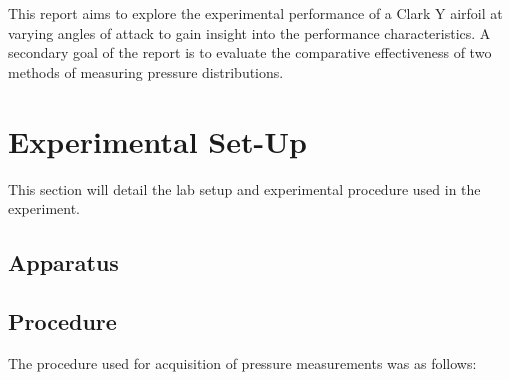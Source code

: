 \documentclass[runningheads]{llncs}
\begin{document}
This report aims to explore the experimental performance of a Clark Y airfoil at varying angles of attack to gain insight into the performance characteristics. A secondary goal of the report is to evaluate the comparative effectiveness of two methods of measuring pressure distributions.





\section{Experimental Set-Up}

This section will detail the lab setup and experimental procedure used in the experiment.

\subsection{Apparatus}

\subsection{Procedure}


The procedure used for acquisition of pressure measurements was as follows:
\end{document}
